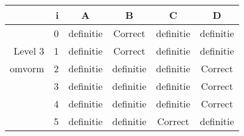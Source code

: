 \begin{tabular}{ rr| c|c|c|c}\hline\hline
     & i & \textbf{A} & \textbf{B} & \textbf{C} & \textbf{D}\\\hline

&0&definitie&Correct\cellcolor[gray]{0.6}&definitie&definitie\\
Level 3 & 1&definitie&Correct\cellcolor[gray]{0.6}&definitie&definitie\\
omvorm &2&definitie&definitie&definitie&Correct\cellcolor[gray]{0.6}\\
&3&definitie&definitie&definitie&Correct\cellcolor[gray]{0.6}\\
&4&definitie&definitie&definitie&Correct\cellcolor[gray]{0.6}\\
&5&definitie&definitie&Correct\cellcolor[gray]{0.6}&definitie\\
\hline\end{tabular}\par\ \newline

